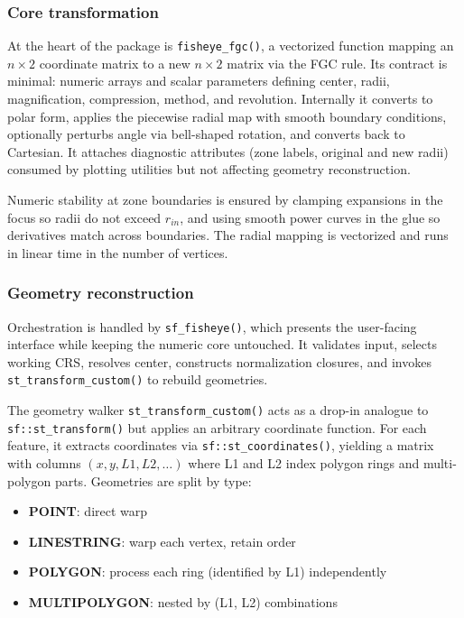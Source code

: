 \subsubsection{Core transformation}\label{core-transformation}

At the heart of the package is \texttt{fisheye\_fgc()}, a vectorized function mapping an \(n \times 2\) coordinate matrix to a new \(n \times 2\) matrix via the FGC rule. Its contract is minimal: numeric arrays and scalar parameters defining center, radii, magnification, compression, method, and revolution. Internally it converts to polar form, applies the piecewise radial map with smooth boundary conditions, optionally perturbs angle via bell-shaped rotation, and converts back to Cartesian. It attaches diagnostic attributes (zone labels, original and new radii) consumed by plotting utilities but not affecting geometry reconstruction.

Numeric stability at zone boundaries is ensured by clamping expansions in the focus so radii do not exceed \(r_{in}\), and using smooth power curves in the glue so derivatives match across boundaries. The radial mapping is vectorized and runs in linear time in the number of vertices.

\subsubsection{Geometry reconstruction}\label{geometry-reconstruction}

Orchestration is handled by \texttt{sf\_fisheye()}, which presents the user-facing interface while keeping the numeric core untouched. It validates input, selects working CRS, resolves center, constructs normalization closures, and invokes \texttt{st\_transform\_custom()} to rebuild geometries.

The geometry walker \texttt{st\_transform\_custom()} acts as a drop-in analogue to \texttt{sf::st\_transform()} but applies an arbitrary coordinate function. For each feature, it extracts coordinates via \texttt{sf::st\_coordinates()}, yielding a matrix with columns \((x, y, L1, L2, \dots)\) where L1 and L2 index polygon rings and multi-polygon parts. Geometries are split by type:

\begin{itemize}
\tightlist
\item
  \textbf{POINT}: direct warp
\item
  \textbf{LINESTRING}: warp each vertex, retain order\\
\item
  \textbf{POLYGON}: process each ring (identified by L1) independently
\item
  \textbf{MULTIPOLYGON}: nested by (L1, L2) combinations
\end{itemize}

